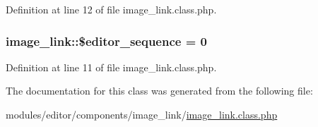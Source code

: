 Definition at line 12 of file image\-\_\-link.\-class.\-php.

\hypertarget{classimage__link_af783692826f89b17fa6e9cf21d4f0f8b}{
\subsubsection[{\$editor\-\_\-sequence}]{\setlength{\rightskip}{0pt plus 5cm}image\-\_\-link\-::\$editor\-\_\-sequence = 0}}\label{classimage__link_af783692826f89b17fa6e9cf21d4f0f8b}


Definition at line 11 of file image\-\_\-link.\-class.\-php.



The documentation for this class was generated from the following file\-:\begin{DoxyCompactItemize}
\item 
modules/editor/components/image\-\_\-link/\hyperlink{image__link_8class_8php}{image\-\_\-link.\-class.\-php}\end{DoxyCompactItemize}
